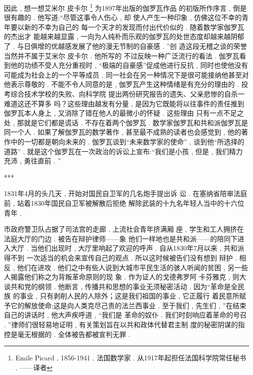 因此 , 想一想艾米尔 \textbullet 皮卡尔 \footnote{Emile Picard , 1856-1941 , 法国数学家 . 从1917年起担任法国科学院常任秘书 . ——译者} 为1897年出版的伽罗瓦作品 的初版所作序言 , 倒是很有趣的 . 他写道:“尽管这事令人伤心 , 却 使人产生一种印象 , 仿佛这位不幸的青年要以新的不幸为自己的 每一个天才的发现而付出代价似的 . 随着数学家伽罗瓦的杰出才 能越来越显露 , 一向为人纯朴而乐观的伽罗瓦的处世态度却越来越阴郁了 . 与日俱增的优越感发展了他的漫无节制的自豪感 . ”创 造这段无稽之谈的荣誉当然并不属于艾米尔 \textbullet 皮卡尔 . 他所写的 不过反映一种广泛流行的看法 . 伽罗瓦看到他的功绩不受人充分重视时 , “极端的自豪感”促成他进行反抗 , 同时也使他没有可能成为社会上的一个平等成员 . 同一社会在另一种情况下是很可能接纳他甚至对他表示尊敬的 . 不能不令人同意的是 , 伽罗瓦产生这种情绪是有充分的理由的 . 投考综合技术学校的失败、向科学院 提出两份研究报告的遗失、父亲悲惨的自杀一难道这还不算多 吗？这些理由越发有分量 , 是因为它既能将以往事件的责任推到 伽罗瓦本人身上 , 又消除了错在他人的最微小的怀疑 . 这些理由 只有一点不足之处 , 那就是它们都是谎话 . 不存在着两个伽罗瓦 . 数学家伽罗瓦和共和派伽罗瓦是同一个人 . 如果了解伽罗瓦的数学著作 , 甚至最不成熟的读者也会感觉到 , 他的著作中的一切都是朝向未来的 . 伽罗瓦谈到“未来数学家的使命” , 谈到他“所选择的 道路” . 就是这个伽罗瓦在一次政治的诉讼上宣布:“我们是小孩 ,  但是 , 我们精力充沛 , 勇往直前 . ”

\begin{center}***
\end{center}

1831年4月的头几天 , 开始对国民自卫军的几名炮手提出诉 讼 . 在塞纳省陪审法庭前 , 站着1830年国民自卫军被解散后拒绝 解除武装的十九名年轻人当中的十六位青年 . 

市政府警卫队占据了司法宫的走廊 . 上流社会青年挤满厢 座 , 学生和工人拥挤在法庭大厅的门边 . 被告在辩护律师——象 他们一样地也是共和派——的陪同下进入大厅 . 当他们出现时 , 大厅里响起了欢迎的呼声 . 自从1830年7月以来 , 共和派得不到 一次适当的机会来宣传自己的观点 . 所以这时候被告们没有想到 辩护 . 相反 , 他们在进攻 . 他们之中有些人说到大城市平民生活的骇人听闻的贫困 , 另一些人揭露他们称之为背叛革命原则的现 象 . 作为证人的戈德弗罗阿 \textbullet 卡芬雅克 , 则大谈共和党的纲领 .  他断言 , 传播共和思想的事业无须秘密活动 . 因为“革命是全民族 的事业 , 只有剥削人民的人除外；这是我们祖国的事业 , 它正履行 着民意所赋予它的解放使命;这是向人类克尽己责的法兰西事业 .  至于我们 , 先生们 , ”在结束自己的讲话时 , 他大声疾呼道 , “我们是 革命的奴仆 . 我们时刻响应着革命的号召 . ”律师们很轻易地证明 , 有关策划旨在以共和政体代替君主制 度的秘密阴谋的指控是毫无根据的 . 全体被告都被宣判无罪 . 

